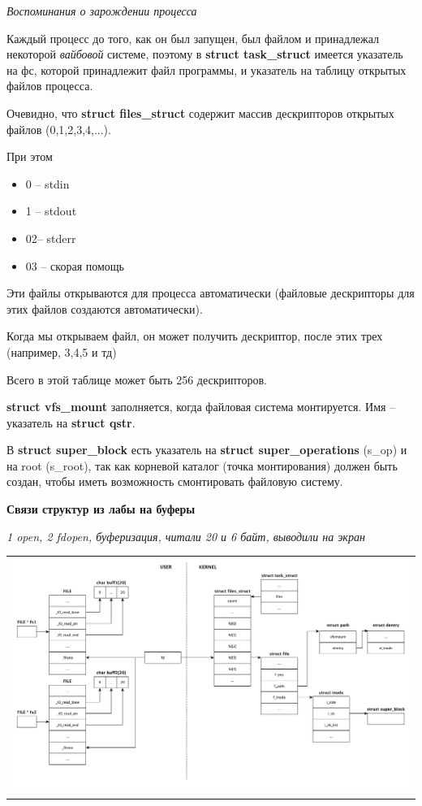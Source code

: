 \textit{Воспоминания о зарождении процесса}

\par Каждый процесс до того, как он был запущен, был файлом и принадлежал некоторой \textit{вайбовой} системе, поэтому в \textbf{struct task\_struct} имеется указатель на фс, которой принадлежит файл программы, и указатель на таблицу открытых файлов процесса.
\par Очевидно, что \textbf{struct files\_struct} содержит массив дескрипторов открытых файлов (0,1,2,3,4,...).
\par При этом 
\begin{itemize}
\item 0 -- stdin
\item 1 -- stdout
\item 02-- stderr
\item 03 -- скорая помощь
\end{itemize}
\par Эти файлы открываются для процесса автоматически (файловые дескрипторы для этих файлов создаются автоматически).
\par Когда мы открываем файл, он может получить дескриптор, после этих трех (например, 3,4,5 и тд)
\par Всего в этой таблице может быть 256 дескрипторов.
\par \textbf{struct vfs\_mount} заполняется, когда файловая система монтируется. Имя -- указатель на \textbf{struct qstr}.
\par В \textbf{struct super\_block} есть указатель на \textbf{struct super\_operations} (s\_op) и на root (s\_root), так как корневой каталог (точка монтирования) должен быть создан, чтобы иметь возможность смонтировать файловую систему.

\textbf{Связи структур из лабы на буферы}

\textit{1 open, 2 fdopen, буферизация, читали 20 и 6 байт, выводили на экран}
\begin{table}[H]
  \centering
  \begin{tabular}{p{1\linewidth}}
    \centering
    \includegraphics[width=0.8\linewidth]{./images/scheme1.pdf}
  \end{tabular}
\end{table}

